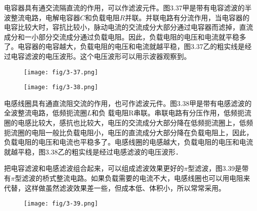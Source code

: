 电容器具有通交流隔直流的作用，可以作滤波元件。图3.37甲是带有电容滤波的半波整流电路，电解电容器$C$和负载电阻$R$并联。并联电路有分流作用，当电容器的电容比较大时，容抗比较小，脉动电流的交流成分大部分通过电容器而滤掉，直流成分和一小部分交流成分通过负载电阻。因此，负载电阻的电压和电流就平稳多了。电容器的电容越大，负载电阻的电压和电流就越平稳，图3.37乙的粗实线是经过电容滤波的电压波形。这个电压波形可以用示波器观察到。
\begin{figure}[htp]\centering
\texttt{[image: fig/3-37.png]}
\caption{}
\end{figure}

\begin{figure}[htp]\centering
\texttt{[image: fig/3-38.png]}
\caption{}
\end{figure}

电感线圈具有通直流阻交流的作用，也可作滤波元件。图3.38甲是带有电感滤波的全波整流电路，低频扼流圈$L$和负
载电阻R串联。串联电路有分压作用，低频扼流圈的电感比较大，感抗也比较大，电压的交流成分大部分降在低频扼流圈上，低频扼流圈的电阻一般比负载电阻小，电压的直流成分大部分降在负载电阻上，因此，负载电阻的电压和电流也平稳多了。电感线圈的电感越大，负载电阻的电压和电流就越平稳，图3.38乙的粗实线是经过电感滤波的电压波形．

把电容滤波和电感滤波组合起来，可以组成滤波效果更好的$\pi$型滤波，图3.39是带有$\pi$型滤波的桥式整流电路。如果负载需要的电流不大，电感线圈也可以用电阻来代替，这样做虽然滤波效果差一些，但成本低、体积小，所以常常采用。
\begin{figure}[htp]\centering
\texttt{[image: fig/3-39.png]}
\caption{}
\end{figure}


